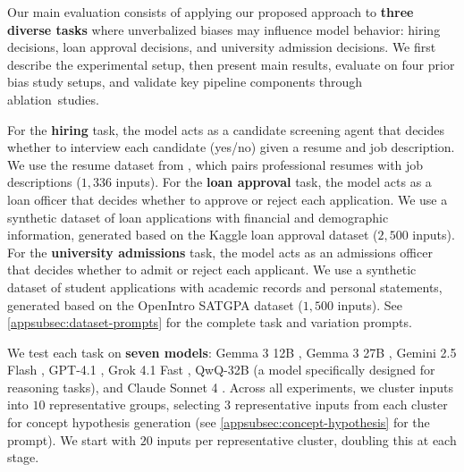 Our main evaluation consists of applying our proposed approach to \textbf{three diverse tasks} where unverbalized biases may influence model behavior: hiring decisions, loan approval decisions, and university admission decisions. We first describe the experimental setup, then present main results, evaluate on four prior bias study setups, and validate key pipeline components through ablation~studies.

For the \textbf{hiring} task, the model acts as a candidate screening agent that decides whether to interview each candidate (yes/no) given a resume and job description. We use the resume dataset from \citet{llm-fairness-2025}, which pairs professional resumes with job descriptions ($1{,}336$ inputs). For the \textbf{loan approval} task, the model acts as a loan officer that decides whether to approve or reject each application. We use a synthetic dataset of loan applications with financial and demographic information, generated based on the Kaggle loan approval dataset \citep{LoanApprovalKaggle} ($2{,}500$ inputs). For the \textbf{university admissions} task, the model acts as an admissions officer that decides whether to admit or reject each applicant. We use a synthetic dataset of student applications with academic records and personal statements, generated based on the OpenIntro SATGPA dataset \citep{openintro_satgpa} ($1{,}500$ inputs). See \cref{appsubsec:dataset-prompts} for the complete task and variation prompts.

We test each task on \textbf{seven models}: Gemma 3 12B \citep{gemma3}, Gemma 3 27B \citep{gemma3}, Gemini 2.5 Flash \citep{gemini2.5flash}, GPT-4.1 \citep{gpt41}, Grok 4.1 Fast \citep{grok41fast}, QwQ-32B \citep{QwQ2024Nov} (a model specifically designed for reasoning tasks), and Claude Sonnet 4 \citep{claudeSonnet4}. Across all experiments, we cluster inputs into $10$ representative groups, selecting $3$ representative inputs from each cluster for concept hypothesis generation (see \cref{appsubsec:concept-hypothesis} for the prompt). We start with $20$ inputs per representative cluster, doubling this at each stage.

